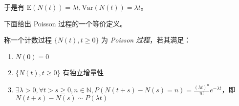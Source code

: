 \documentclass[../main.tex]{subfiles}
\begin{document}
于是有 $\mathrm E(N(t))=\lambda t,\mathrm{Var}(N(t))=\lambda t$。

下面给出 Poisson 过程的一个等价定义。

\begin{definition}\label{def:6.1.4}
    称一个计数过程 $\{N(t),t\geq0\}$ 为 \emph{Poisson 过程}，若其满足：
    \begin{enumerate}
        \item $N(0)=0$
        \item $\{N(t),t\geq0\}$ 有独立增量性
        \item $\exists\lambda>0,\forall t>s\geq0,n\in\mathbb N,P(N(t+s)-N(s)=n)=\frac{(\lambda t)^n}{n!}e^{-\lambda t}$，即 $N(t+s)-N(s)\sim P(\lambda t)$
    \end{enumerate}
\end{definition}
\end{document}
